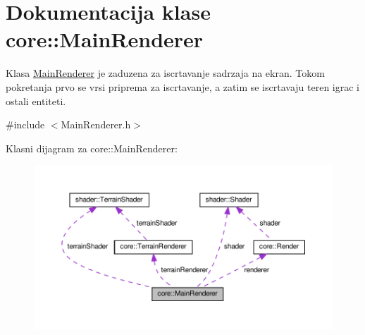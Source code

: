 \hypertarget{classcore_1_1MainRenderer}{}\section{Dokumentacija klase core\+:\+:Main\+Renderer}
\label{classcore_1_1MainRenderer}


Klasa \hyperlink{classcore_1_1MainRenderer}{Main\+Renderer} je zaduzena za iscrtavanje sadrzaja na ekran. Tokom pokretanja prvo se vrsi priprema za iscrtavanje, a zatim se iscrtavaju teren igrac i ostali entiteti.  




{\ttfamily \#include $<$Main\+Renderer.\+h$>$}



Klasni dijagram za core\+:\+:Main\+Renderer\+:\nopagebreak
\begin{figure}[H]
\begin{center}
\leavevmode
\includegraphics[width=350pt]{classcore_1_1MainRenderer__coll__graph}
\end{center}
\end{figure}
